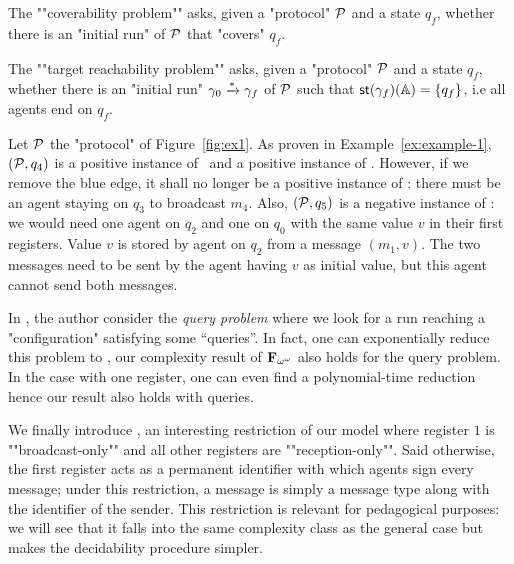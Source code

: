 	
\begin{definition}

	\AP The ""coverability problem"" \COVER asks, given a "protocol" $\mathcal{P}$ and a state $q_f$, whether there is an "initial run" of $\mathcal{P}$ that "covers" $q_f$.
	
	\AP The ""target reachability problem"" \TARGET asks, given a "protocol" $\mathcal{P}$ and a state $q_f$, whether there is an "initial run" $\gamma_0 \xrightarrow{*} \gamma_f$ of $\mathcal{P}$ such that $\mathsf{st}(\gamma_f)(\mathbb{A}) = \{q_f\}$, i.e all agents end on $q_f$.
\end{definition}

\begin{example}\label{example-2}
	Let $\mathcal{P}$ the "protocol" of Figure~\ref{fig:ex1}. As proven in Example~\ref{ex:example-1}, $(\mathcal{P},q_4)$ is a positive instance of \COVER~and a positive instance of \TARGET. However, if we remove the blue edge, it shall no longer be a positive instance of \TARGET: there must be an agent staying on $q_3$ to broadcast $m_4$. Also, $(\mathcal{P}, q_5)$ is a negative instance of \COVER: we would need one agent on $q_2$ and one on $q_0$ with the same value $v$ in their first registers. Value $v$ is stored by agent on $q_2$ from a message $(m_1,v)$. The two messages need to be sent by the agent having $v$ as initial value, but this agent cannot send both messages.
\end{example}

\begin{remark}
	In \cite{DelzannoST13}, the author consider the \AP \emph{query problem} where we look for a run reaching a "configuration" satisfying some ``queries''.	
	In fact, one can exponentially reduce this problem to \COVER, our complexity result of $\mathbf{F}_{\omega^\omega}$ also holds for the query problem. In the case with one register, one can even find a polynomial-time reduction hence our \NP result also holds with queries. 
\end{remark}

\AP We finally introduce , an interesting restriction of our model where register $1$ is ""broadcast-only"" and all other registers are ""reception-only"". Said otherwise, the first register acts as a permanent identifier with which agents sign every message; under this restriction, a message is simply a message type along with the identifier of the sender. This restriction is relevant for pedagogical purposes: we will see that it falls into the same complexity class as the general case but makes the decidability procedure simpler. 


